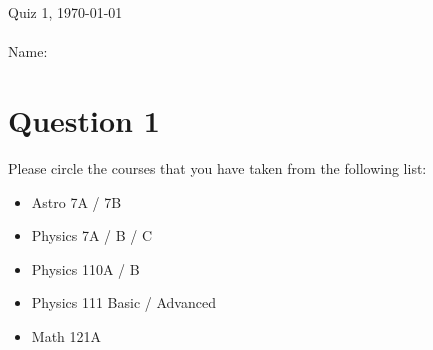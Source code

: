 \documentclass[10pt]{article}
\begin{document}
\vspace{-0.1in}
{\noindent \large Quiz 1, \today}\\ \\
{\large Name:} 
\vspace{-0.1in}

\section*{Question 1}
\vspace{-0.1in}
Please circle the courses that you have taken from the following list: \\
\vspace{-0.2in}
\begin{itemize}
\item Astro 7A / 7B \\
\vspace{-0.2in}
\item Physics 7A / B / C \\   
\vspace{-0.2in}
\item Physics 110A / B \\   
\vspace{-0.2in}
\item Physics 111 Basic / Advanced \\
\vspace{-0.2in}
\item Math 121A \\
\vspace{-0.2in}
\end{itemize}
\end{document}
